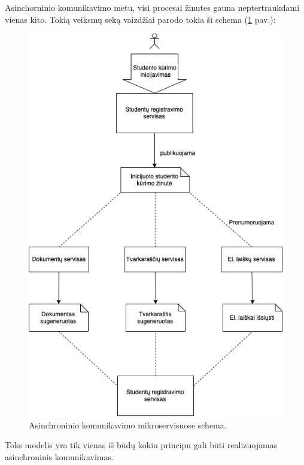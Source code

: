 Asinchorninio komunikavimo metu, visi procesai žinutes gauna neptertraukdami vienas kito. 
Tokią veiksmų seką vaizdžiai parodo tokia ši schema (\ref{img:asynchronous-microservice-model} pav.):

\begin{figure}[H]
  \centering
  \includegraphics[scale=0.6]{img/asynchronous-microservice-model}
  \caption{Asinchroninio komunikavimo mikroservisuose schema.}
  \label{img:asynchronous-microservice-model}
\end{figure}

Toks modelis yra tik vienas iš būdų kokiu principu gali būti realizuojamas asinchroninis komunikavimas.

